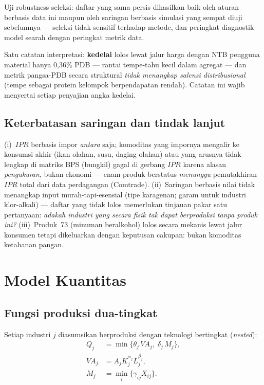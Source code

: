 \documentclass[11pt,a4paper]{article}
\newcommand{\en}[1]{\textit{#1}}   %
\begin{document}
Uji robustness seleksi: daftar yang sama persis dihasilkan baik oleh
aturan berbasis data ini maupun oleh saringan berbasis simulasi yang
sempat diuji sebelumnya --- seleksi tidak sensitif terhadap metode, dan
peringkat diagnostik model searah dengan peringkat metrik data.

Satu catatan interpretasi: \textbf{kedelai} lolos lewat jalur harga
dengan NTB pengguna material hanya 0{,}36\% PDB --- rantai tempe-tahu
kecil dalam agregat --- dan metrik pangsa-PDB secara struktural
\emph{tidak menangkap salensi distribusional} (tempe sebagai protein
kelompok berpendapatan rendah). Catatan ini wajib menyertai setiap
penyajian angka kedelai.

\subsection{Keterbatasan saringan dan tindak lanjut}

(i)~$IPR$ berbasis impor \emph{antara} saja; komoditas yang impornya
mengalir ke konsumsi akhir (ikan olahan, susu, daging olahan) atau yang
arusnya tidak lengkap di matriks BPS (bungkil) gagal di gerbang $IPR$
karena alasan \emph{pengukuran}, bukan ekonomi --- enam produk berstatus
\emph{menunggu} pemutakhiran $IPR$ total dari data perdagangan (Comtrade).
(ii)~Saringan berbasis nilai tidak menangkap input murah-tapi-esensial
(tipe karagenan; garam untuk industri klor-alkali) --- daftar yang tidak
lolos memerlukan tinjauan pakar satu pertanyaan: \emph{adakah industri
yang secara fisik tak dapat berproduksi tanpa produk ini?}
(iii)~Produk~73 (minuman beralkohol) lolos secara mekanis lewat jalur
konsumen tetapi dikeluarkan dengan keputusan cakupan: bukan komoditas
ketahanan pangan.

\section{Model Kuantitas}

\subsection{Fungsi produksi dua-tingkat}
\label{sec:prodfn}

Setiap industri $j$ diasumsikan berproduksi dengan teknologi bertingkat
(\en{nested}):
\begin{align}
Q_j &= \min\bigl\{\theta_j \, VA_j,\; \delta_j \, M_j\bigr\},
\label{eq:topnest}\\
VA_j &= A_j K_j^{\alpha_j} L_j^{\beta_j},
\label{eq:cobb}\\
M_j &= \min_i \bigl\{\gamma_{ij} X_{ij}\bigr\}.
\label{eq:matnest}
\end{align}
\end{document}
